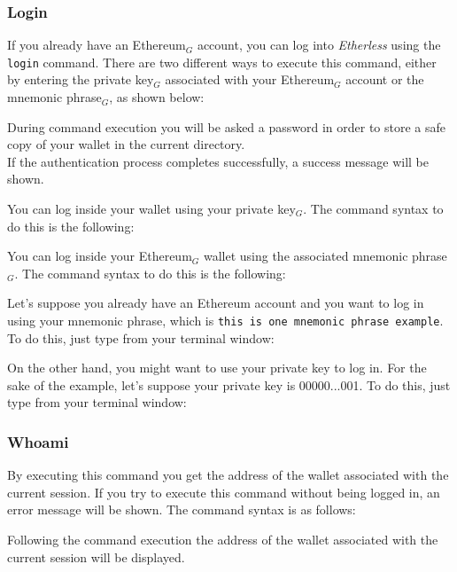 \subsubsection{Login}
If you already have an Ethereum$_{G}$ account, you can log into \textit{Etherless} using the \texttt{login} command. There are two different ways to execute this command, either by entering the private key$_{G}$ associated with your Ethereum$_{G}$ account or the mnemonic phrase$_{G}$, as shown below: \\
\begin{center}
\end{center}
During command execution you will be asked a password in order to store a safe copy of your wallet in the current directory. \\
If the authentication process completes successfully, a success message will be shown.

You can log inside your wallet using your private key$_{G}$. The command syntax to do this is the following:
\begin{center}
\end{center}

You can log inside your Ethereum$_{G}$ wallet using the associated mnemonic phrase$_{G}$. The command syntax to do this is the following:
\begin{center}
\end{center}

Let's suppose you already have an Ethereum account and you want to log in using your mnemonic phrase, which is \texttt{this is one mnemonic phrase example}. To do this, just type from your terminal window:
\begin{center}
\end{center}

On the other hand, you might want to use your private key to log in. For the sake of the example,  let's suppose your private key is 00000...001. To do this, just type from your terminal window:
\begin{center}
\end{center}


\subsubsection{Whoami}
By executing this command you get the address of the wallet associated with the current session. If you try to execute this command without being logged in, an error message will be shown. The command syntax is as follows: 
\begin{center}
\end{center}
Following the command execution the address of the wallet associated with the current session will be displayed.

